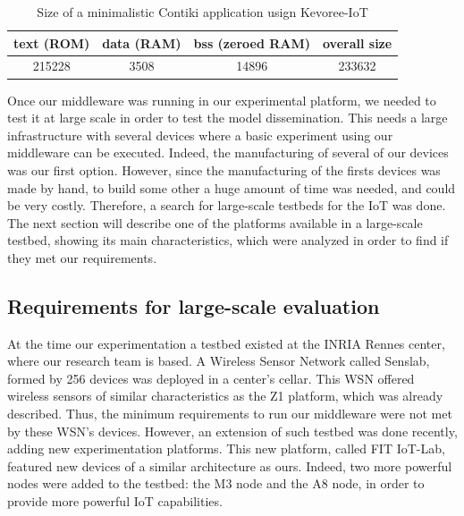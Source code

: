 \begin{table}[htb]
	\centering
	\caption{Size of a minimalistic Contiki application usign Kevoree-IoT}
	\label{tab:kevoreeContiki}
	\begin{tabular}{|c|c|c|c|}
		\hline
		\textbf{text (ROM)}   & \textbf{data (RAM)} & \textbf{bss (zeroed RAM)} & \textbf{overall size} \\ \hline
		215228 & 3508 & 14896 & 233632 \\ \hline     
	\end{tabular}
\end{table}


Once our middleware was running in our experimental platform, we needed to test it at large scale in order to test the model dissemination.
This needs a large infrastructure with several devices where a basic experiment using our middleware can be executed.
Indeed, the manufacturing of several of our devices was our first option.
However, since the manufacturing of the firsts devices was made by hand, to build some other a huge amount of time was needed, and could be very costly.
Therefore, a search for large-scale testbeds for the IoT was done.
The next section will describe one of the platforms available in a large-scale testbed, showing its main characteristics, which were analyzed in order to find if they met our requirements.

\subsection{Requirements for large-scale evaluation}
\label{sec:iotlab}
At the time our experimentation a testbed existed at the INRIA Rennes center, where our research team is based.
A Wireless Sensor Network called Senslab\cite{des2011senslab}, formed by 256 devices was deployed in a center's cellar.
This WSN offered wireless sensors of similar characteristics as the Z1 platform, which was already described.
Thus, the minimum requirements to run our middleware were not met by these WSN's devices.
However, an extension of such testbed was done recently, adding new experimentation platforms.
This new platform, called FIT IoT-Lab\cite{Fleury15iotlab}, featured new devices of a similar architecture as ours.
Indeed, two more powerful nodes were added to the testbed: the M3 node and the A8 node, in order to provide more powerful IoT capabilities.

